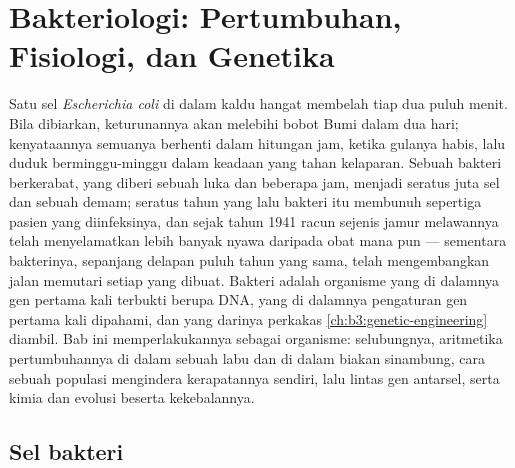 \chapter{Bakteriologi: Pertumbuhan, Fisiologi, dan Genetika}\label{ch:b3:bacteriology}

Satu sel \emph{Escherichia coli} di dalam kaldu hangat membelah tiap
dua puluh menit. Bila dibiarkan, keturunannya akan melebihi bobot Bumi dalam
dua hari; kenyataannya semuanya berhenti dalam hitungan jam, ketika gulanya
habis, lalu duduk berminggu-minggu dalam keadaan yang tahan kelaparan. Sebuah
bakteri berkerabat, yang diberi sebuah luka dan beberapa jam, menjadi seratus
juta sel dan sebuah demam; seratus tahun yang lalu bakteri itu membunuh
sepertiga pasien yang diinfeksinya, dan sejak tahun 1941 racun sejenis jamur
melawannya telah menyelamatkan lebih banyak nyawa daripada obat mana pun ---
sementara bakterinya, sepanjang delapan puluh tahun yang sama, telah
mengembangkan jalan memutari setiap  yang dibuat.
Bakteri adalah organisme yang di dalamnya gen pertama kali terbukti berupa
DNA, yang di dalamnya pengaturan gen pertama kali dipahami, dan yang darinya
perkakas \cref{ch:b3:genetic-engineering} diambil. Bab ini
memperlakukannya sebagai organisme: selubungnya, aritmetika pertumbuhannya di
dalam sebuah labu dan di dalam biakan sinambung, cara sebuah populasi
mengindera kerapatannya sendiri, lalu lintas gen antarsel, serta
kimia dan evolusi  beserta kekebalannya.

\section{Sel bakteri}

